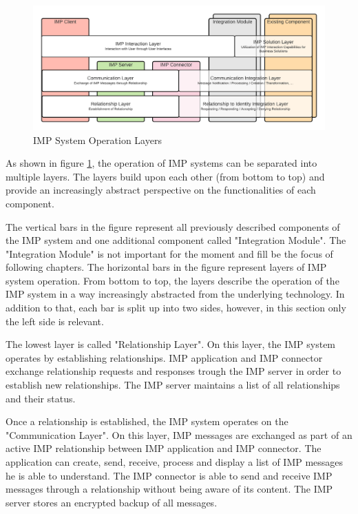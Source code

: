 \begin{figure}[h]
    \centering
    \includegraphics[scale=0.6]{Diagrams/IMP Layer Diagram.pdf}
    \caption{IMP System Operation Layers}
    \label{imp:layer_diagram}
\end{figure}

As shown in figure \ref{imp:layer_diagram}, the operation of IMP systems can be separated into multiple layers. The layers build upon each other (from bottom to top) and provide an increasingly abstract perspective on the functionalities of each component. 

The vertical bars in the figure represent all previously described components of the IMP system and one additional component called "Integration Module". The "Integration Module" is not important for the moment and fill be the focus of following chapters. The horizontal bars in the figure represent layers of IMP system operation. From bottom to top, the layers describe the operation of the IMP system in a way increasingly abstracted from the underlying technology. In addition to that, each bar is split up into two sides, however, in this section only the left side is relevant.

The lowest layer is called "Relationship Layer". On this layer, the IMP system operates by establishing relationships. IMP application and IMP connector exchange relationship requests and responses trough the IMP server in order to establish new relationships. The IMP server maintains a list of all relationships and their status.

Once a relationship is established, the IMP system operates on the "Communication Layer". On this layer, IMP messages are exchanged as part of an active IMP relationship between IMP application and IMP connector. The application can create, send, receive, process and display a list of IMP messages he is able to understand. The IMP connector is able to send and receive IMP messages through a relationship without being aware of its content. The IMP server stores an encrypted backup of all messages.

